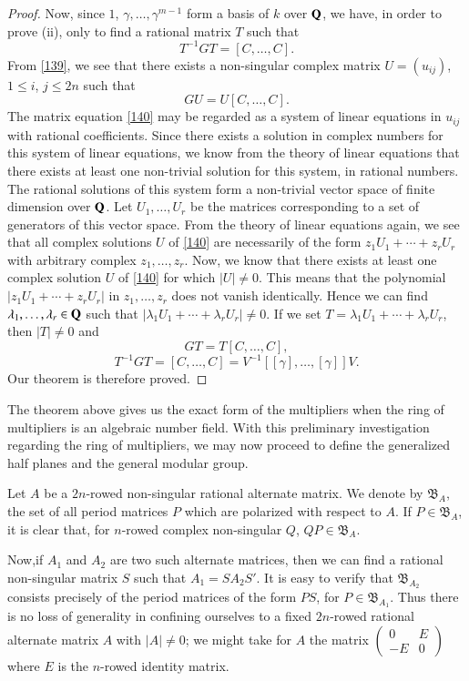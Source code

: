 \begin{proof}
Now, since $1$, $\gamma,\ldots,\gamma^{m-1}$ form a basis of $k$ over
$\mathbf{Q}$, we have, in order to prove (ii), only to find a rational matrix
$T$ such that
$$
T^{-1}GT=[C,\ldots,C].
$$\pageoriginale
From \eqref{139}, we see that there exists a non-singular complex
matrix $U=(u_{ij})$, $1\leq i$, $j\leq 2n$ such that
\begin{equation*}
GU=U[C,\ldots,C].\tag{140}\label{140}
\end{equation*}
The matrix equation \eqref{140} may be regarded as a system of linear
equations in $u_{ij}$ with rational coefficients. Since there exists a
solution in complex numbers for this system of linear equations, we
know from the theory of linear equations that there exists at least
one non-trivial solution for this system, in rational numbers. The
rational solutions of this system form a non-trivial vector space of
finite dimension over $\mathbf{Q}$. Let $U_{1},\ldots,U_{r}$ be the matrices
corresponding to a set of generators of this vector space. From the
theory of linear equations again, we see that all complex solutions
$U$ of \eqref{140} are necessarily of the form $z_{1}U_{1}+\cdots
+z_{r}U_{r}$ with arbitrary complex $z_{1},\ldots,z_{r}$. Now, we know
that there exists at least one complex solution $U$ of \eqref{140} for
which $|U|\neq 0$. This means that the polynomial
$|z_{1}U_{1}+\cdots+z_{r}U_{r}|$ in $z_{1},\ldots,z_{r}$ does not
vanish identically. Hence we can find
$\lambda_{1},\ldots,\lambda_{r}\in \mathbf{Q}$ such that
$|\lambda_{1}U_{1}+\cdots+\lambda_{r}U_{r}|\neq 0$. If we set
$T=\lambda_{1}U_{1}+\cdots+\lambda_{r}U_{r}$, then $|T|\neq 0$ and 
$$
GT=T[C,\ldots,C],
$$
\ie
$$
T^{-1}GT=[C,\ldots,C]=V^{-1}[[\gamma],\ldots,[\gamma]]V.
$$
Our theorem is therefore proved.
\end{proof}

The theorem above gives us the exact form of the multipliers when the
ring of multipliers is an algebraic number field. With this
preliminary investigation regarding the ring of multipliers, we may
now proceed to define the generalized half planes and the general
modular group.

Let $A$ be a $2n$-rowed non-singular rational alternate matrix. We
denote by $\mathfrak{B}_{A}$, the set of all period matrices $P$ which
are polarized with respect to $A$. If $P\in\mathfrak{B}_{A}$, it is
clear that, for $n$-rowed complex non-singular $Q$,
$QP\in\mathfrak{B}_{A}$.

Now,\pageoriginale if $A_{1}$ and $A_{2}$ are two such alternate
matrices, then we can find a rational non-singular matrix $S$ such
that $A_{1}=SA_{2}S'$. It is easy to verify that
$\mathfrak{B}_{A_{2}}$ consists precisely of the period matrices of
the form $PS$, for $P\in\mathfrak{B}_{A_{1}}$. Thus there is no loss
of generality in confining ourselves to a fixed $2n$-rowed rational
alternate matrix $A$ with $|A|\neq 0$; we might take for $A$ the
matrix $\left(\begin{smallmatrix} 0 & E\\ -E & 0
\end{smallmatrix}\right)$ where $E$ is the $n$-rowed identity matrix.

